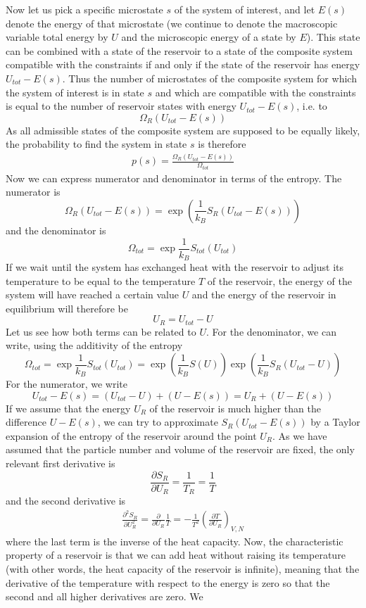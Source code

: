 \documentclass[a4paper, draft]{article}
\theoremstyle{own}
\theoremstyle{remark}
\begin{document}
Now let us pick a specific microstate $s$ of the system of interest, and let $E(s)$ denote the energy of that microstate (we continue to denote the macroscopic variable total energy by $U$ and the microscopic energy of a state by $E$). This state can be combined with a state of the reservoir to  a state of the composite system compatible with the constraints if and only if the state of the reservoir has energy $U_{tot} - E(s)$. Thus the number of microstates of the composite system for which the system of interest is in state $s$ and which are compatible with the constraints is equal to the number of reservoir states with energy $U_{tot} - E(s)$, i.e. to
$$
\Omega_R(U_{tot} - E(s))
$$
As all admissible states of the composite system are supposed to be equally likely, the probability to find the system in state $s$ is therefore
\begin{align}\label{eq:probsubsystem}
p(s) = \frac{\Omega_R(U_{tot} - E(s))}{\Omega_{tot}}
\end{align}
Now we can express numerator and denominator in terms of the entropy. The numerator is
$$
\Omega_R(U_{tot} - E(s)) = \exp(\frac{1}{k_B} S_R(U_{tot} - E(s)))
$$
and the denominator is
$$
\Omega_{tot} = \exp \frac{1}{k_B} S_{tot}(U_{tot}) 
$$
If we wait until the system has exchanged heat with the reservoir to adjust its temperature to be equal to the temperature $T$ of the reservoir, the energy of the system will have reached a certain value $U$ and the energy of the reservoir in equilibrium will therefore be 
$$
U_R = U_{tot} - U
$$
Let us see how both terms can be related to $U$. For the denominator, we can write, using the additivity of the entropy
$$
\Omega_{tot} = \exp \frac{1}{k_B} S_{tot}(U_{tot}) = \exp(\frac{1}{k_B} S(U)) \exp(\frac{1}{k_B} S_R(U_{tot} - U))
$$
For the numerator, we write
$$
U_{tot} - E(s) = (U_{tot} - U) + (U - E(s)) =  U_R + (U - E(s))
$$
If we assume that the energy $U_R$ of the reservoir is much higher than the difference $U - E(s)$, we can try to approximate $S_R(U_{tot} - E(s))$ by 
a Taylor expansion of the entropy of the reservoir around the point $U_R$. As we have assumed that the particle number and volume of the reservoir are fixed, the only relevant first derivative is
$$
\frac{\partial S_R}{\partial U_R} = \frac{1}{T_R} = \frac{1}{T}
$$
and the second derivative is
\begin{align*}
\frac{\partial^2 S_R}{\partial U_R^2} = \frac{\partial}{\partial U_R} \frac{1}{T} 
= - \frac{1}{T^2} (\frac{\partial T}{\partial U_R})_{V,N} 
\end{align*}
where the last term is the inverse of the heat capacity. Now, the characteristic property of a reservoir is that we can add heat without raising its temperature (with other words, the heat capacity of the reservoir is infinite), meaning that the derivative of the temperature with respect to the energy is zero so that the second and all higher derivatives are zero. We 
\end{document}
